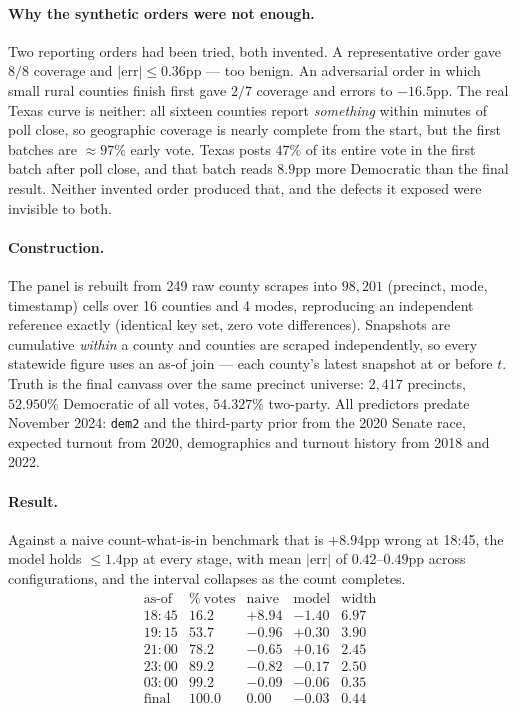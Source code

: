 \documentclass[11pt]{article}
\begin{document}
\paragraph{Why the synthetic orders were not enough.} Two reporting orders had been tried,
both invented. A representative order gave $8/8$ coverage and $|\textrm{err}| \le 0.36$pp
--- too benign. An adversarial order in which small rural counties finish first gave $2/7$
coverage and errors to $-16.5$pp. The real Texas curve is neither: all sixteen counties
report \emph{something} within minutes of poll close, so geographic coverage is nearly
complete from the start, but the first batches are $\approx 97\%$ early vote. Texas posts
$47\%$ of its entire vote in the first batch after poll close, and that batch reads
$8.9$pp more Democratic than the final result. Neither invented order produced that, and
the defects it exposed were invisible to both.

\paragraph{Construction.} The panel is rebuilt from 249 raw county scrapes into $98{,}201$
(precinct, mode, timestamp) cells over 16 counties and 4 modes, reproducing an independent
reference exactly (identical key set, zero vote differences). Snapshots are cumulative
\emph{within} a county and counties are scraped independently, so every statewide figure
uses an as-of join --- each county's latest snapshot at or before $t$. Truth is the final
canvass over the same precinct universe: $2{,}417$ precincts, $52.950\%$ Democratic of all
votes, $54.327\%$ two-party. All predictors predate November 2024: \texttt{dem2} and the
third-party prior from the 2020 Senate race, expected turnout from 2020, demographics and
turnout history from 2018 and 2022.

\paragraph{Result.} Against a naive count-what-is-in benchmark that is $+8.94$pp wrong at
18:45, the model holds $\le 1.4$pp at every stage, with mean $|\textrm{err}|$ of
$0.42$--$0.49$pp across configurations, and the interval collapses as the count completes.
\[
\begin{array}{lrrrr}
\textrm{as-of} & \%\ \textrm{votes} & \textrm{naive} & \textrm{model} & \textrm{width}\\
18{:}45 & 16.2 & +8.94 & -1.40 & 6.97\\
19{:}15 & 53.7 & -0.96 & +0.30 & 3.90\\
21{:}00 & 78.2 & -0.65 & +0.16 & 2.45\\
23{:}00 & 89.2 & -0.82 & -0.17 & 2.50\\
03{:}00 & 99.2 & -0.09 & -0.06 & 0.35\\
\textrm{final} & 100.0 & 0.00 & -0.03 & 0.44
\end{array}
\]
\end{document}
